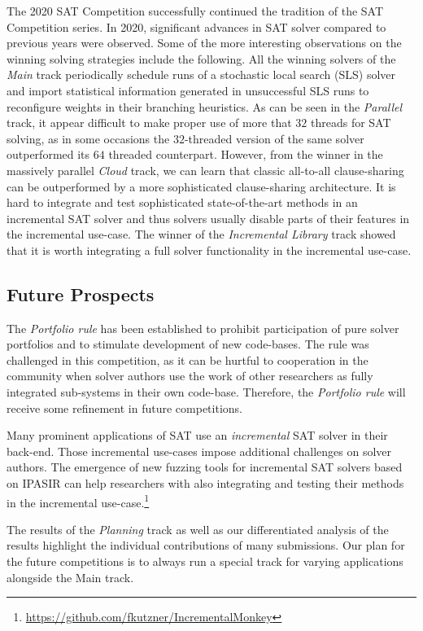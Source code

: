 \documentclass{elsarticle}
\begin{document}
The 2020 SAT Competition successfully continued the tradition of the SAT Competition series. In 2020, significant advances
in SAT solver compared to previous years were observed. Some of the more interesting observations on the winning solving 
strategies include the following.
All the winning solvers of the \emph{Main} track periodically schedule runs of a stochastic local search (SLS)
solver and import statistical information generated in unsuccessful SLS runs to reconfigure weights in their branching heuristics. As can be seen in the \emph{Parallel} track, it appear difficult to make proper use of more that $32$ threads for SAT solving, as in some occasions the $32$-threaded version of the same solver outperformed its $64$ threaded counterpart. 
However, from the winner in the massively parallel \emph{Cloud} track, we can learn that classic all-to-all clause-sharing can be outperformed by a more sophisticated clause-sharing architecture. 
It is hard to integrate and test sophisticated state-of-the-art methods in an incremental SAT solver and thus solvers usually disable parts of their features in the incremental use-case. 
The winner of the \emph{Incremental Library} track showed that it is worth integrating a full solver functionality in the incremental use-case. 

\subsection*{Future Prospects}

The \emph{Portfolio rule} has been established to prohibit participation of pure solver portfolios and to stimulate development of new code-bases. 
The rule was challenged in this competition, as it can be hurtful to cooperation in the community when solver authors use the work of other researchers as fully integrated sub-systems in their own code-base. 
Therefore, the \emph{Portfolio rule} will receive some refinement in future competitions. 

Many prominent applications of SAT use an \emph{incremental} SAT solver in their back-end. 
Those incremental use-cases impose additional challenges on solver authors. 
The emergence of new fuzzing tools for incremental SAT solvers based on IPASIR can help researchers with also integrating and testing their methods in the incremental use-case.\footnote{\url{https://github.com/fkutzner/IncrementalMonkey}} 

The results of the \emph{Planning} track as well as our differentiated analysis of the results highlight the individual contributions of many submissions. 
Our plan for the future competitions is to always run a special track for varying applications alongside the Main track. 
\end{document}
